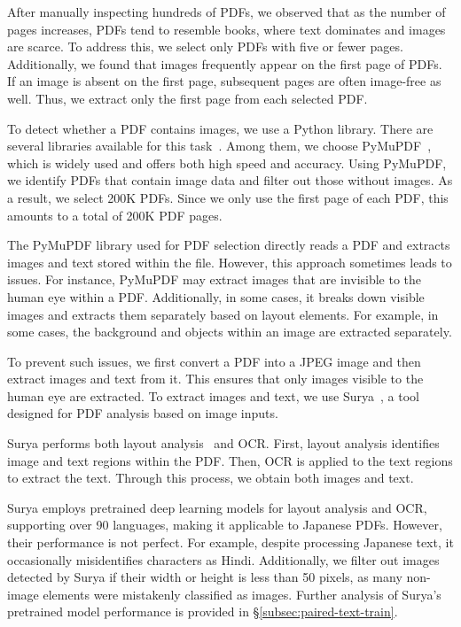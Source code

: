 After manually inspecting hundreds of PDFs, we observed that as the number of pages increases, PDFs tend to resemble books, where text dominates and images are scarce.
To address this, we select only PDFs with five or fewer pages.
Additionally, we found that images frequently appear on the first page of PDFs.
If an image is absent on the first page, subsequent pages are often image-free as well.
Thus, we extract only the first page from each selected PDF.

To detect whether a PDF contains images, we use a Python library.
There are several libraries available for this task~\cite{PyMuPDF,pdf2image,pdfminersix}.
Among them, we choose PyMuPDF~\cite{PyMuPDF}, which is widely used and offers both high speed and accuracy.
Using PyMuPDF, we identify PDFs that contain image data and filter out those without images.
As a result, we select 200K PDFs. Since we only use the first page of each PDF, this amounts to a total of 200K PDF pages.


The PyMuPDF library used for PDF selection directly reads a PDF and extracts images and text stored within the file.
However, this approach sometimes leads to issues.
For instance, PyMuPDF may extract images that are invisible to the human eye within a PDF.
Additionally, in some cases, it breaks down visible images and extracts them separately based on layout elements. 
For example, in some cases, the background and objects within an image are extracted separately.

To prevent such issues, we first convert a PDF into a JPEG image and then extract images and text from it.
This ensures that only images visible to the human eye are extracted.
To extract images and text, we use Surya~\cite{Surya}, a tool designed for PDF analysis based on image inputs.

Surya performs both layout analysis~\cite{shen2021layoutparser} and OCR.
First, layout analysis identifies image and text regions within the PDF.
Then, OCR is applied to the text regions to extract the text.
Through this process, we obtain both images and text.

Surya employs pretrained deep learning models for layout analysis and OCR, supporting over 90 languages, making it applicable to Japanese PDFs.
However, their performance is not perfect.
For example, despite processing Japanese text, it occasionally misidentifies characters as Hindi.
Additionally, we filter out images detected by Surya if their width or height is less than 50 pixels, as many non-image elements were mistakenly classified as images.
Further analysis of Surya’s pretrained model performance is provided in \S\ref{subsec:paired-text-train}.


